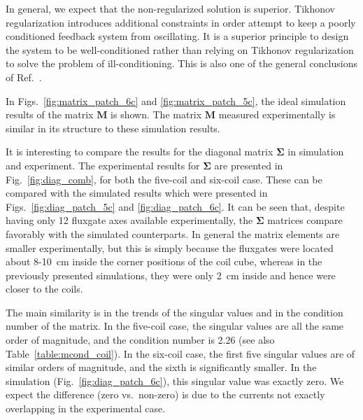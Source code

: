 In general, we expect that the non-regularized solution is superior.
Tikhonov regularization introduces additional constraints in order
attempt to keep a poorly conditioned feedback system from oscillating.
It is a superior principle to design the system to be well-conditioned
rather than relying on Tikhonov regularization to solve the problem of
ill-conditioning.  This is also one of the general conclusions of
Ref.~\cite{rawlik}.

In Figs.~\ref{fig:matrix_patch_6c} and \ref{fig:matrix_patch_5c}, the ideal simulation results of the matrix $\bm{M}$ is shown.  The matrix $\bm{M}$ measured
experimentally is similar in its structure to these simulation
results.


It is interesting to compare the results for the diagonal matrix
$\bm{\Sigma}$ in simulation and experiment.  The experimental results
for $\bm{\Sigma}$ are presented in Fig.~\ref{fig:diag_comb}, for both
the five-coil and six-coil case.  These can be compared with the
simulated results which were presented in
Figs.~\ref{fig:diag_patch_5c} and \ref{fig:diag_patch_6c}.  It can be
seen that, despite having only 12 fluxgate axes available
experimentally, the $\bm{\Sigma}$ matrices compare favorably with the
simulated counterparts.  In general the matrix elements are smaller
experimentally, but this is simply because the fluxgates were located
about 8-10~cm inside the corner positions of the coil cube, whereas in
the previously presented simulations, they were only 2~cm inside and
hence were closer to the coils.

The main similarity is in the trends of the singular values and in the
condition number of the matrix.  In the five-coil case, the singular
values are all the same order of magnitude, and the condition number
is 2.26 (see also Table~\ref{table:mcond_coil}).  In the six-coil
case, the first five singular values are of similar orders of
magnitude, and the sixth is significantly smaller.  In the simulation
(Fig.~\ref{fig:diag_patch_6c}), this singular value was exactly zero.
We expect the difference (zero vs.~non-zero) is due to the currents
not exactly overlapping in the experimental case.

